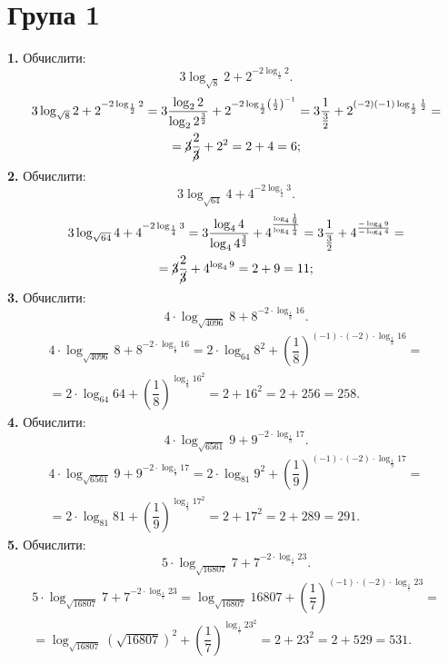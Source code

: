 \section*{Група 1}
\textbf{1.} Обчислити:
$$
3 \log_{\sqrt{8}} 2 + 2^{-2\log_{\frac{1}{2}} 2}.
$$
\begin{multline*}
3 \log_{\sqrt{8}} 2 + 2^{-2\log_{\frac{1}{2}} 2} =
3\frac{\log_2 2}{\log_2 2^\frac{3}{2}} + 2^{-2 \log_{\frac{1}{2}} \left(\frac{1}{2}\right)^{-1}} =
3\frac{1}{\frac{3}{2}} + 2^{(-2)(-1)\log_{\frac{1}{2}} \frac{1}{2}} =\\
= \cancel{3}\frac{2}{\cancel{3}} + 2^2 = 2 + 4 = 6;
\end{multline*}
\textbf{2.} Обчислити:
$$
3\log_{\sqrt{64}} 4 + 4^{-2\log_{\frac{1}{4}} 3}.
$$
\begin{multline*}
3\log_{\sqrt{64}} 4 + 4^{-2\log_{\frac{1}{4}} 3} =
3\frac{\log_4 4}{\log_4 4^{\frac{3}{2}}} + 4^{\frac{\log_4 \frac{1}{9}}{\log_4 \frac{1}{4}}} =
3\frac{1}{\frac{3}{2}} + 4^{\frac{-\log_4 9}{-\log_4 4}} =\\
= \cancel{3}\frac{2}{\cancel{3}} + 4^{\log_4 9} = 2 + 9 = 11;
\end{multline*}
\textbf{3.} Обчислити:
$$
4\cdot\log_{\sqrt{4096}}8+8^{-2\cdot\log_{\frac{1}{8}}16}.
$$
\begin{multline*}
4\cdot\log_{\sqrt{4096}}8+8^{-2\cdot\log_{\frac{1}{8}}16}=
2\cdot\log_{64}8^2+\left(\dfrac{1}{8}\right)^{(-1)\cdot(-2)\cdot\log_{\frac{1}{8}}16}=\\
=2\cdot\log_{64}64+\left(\dfrac{1}{8}\right)^{\log_{\frac{1}{8}}16^2}=
2+16^2=2+256=258.
\end{multline*}
\textbf{4.} Обчислити:
$$
4\cdot\log_{\sqrt{6561}}9+9^{-2\cdot\log_{\frac{1}{9}}17}.
$$
\begin{multline*}
4\cdot\log_{\sqrt{6561}}9+9^{-2\cdot\log_{\frac{1}{9}}17}=
2\cdot\log_{81}9^2+\left(\dfrac{1}{9}\right)^{(-1)\cdot(-2)\cdot\log_{\frac{1}{9}}17}=\\
=2\cdot\log_{81}81+\left(\dfrac{1}{9}\right)^{\log_{\frac{1}{9}}17^2}=
2+17^2=2+289=291.
\end{multline*}
\textbf{5.} Обчислити:
$$
5\cdot\log_{\sqrt{16807}}7+7^{-2\cdot\log_{\frac{1}{7}}23}.
$$
\begin{multline*}
5\cdot\log_{\sqrt{16807}}7+7^{-2\cdot\log_{\frac{1}{7}}23}=
\log_{\sqrt{16807}}16807+\left(\dfrac{1}{7}\right)^{(-1)\cdot(-2)\cdot\log_{\frac{1}{7}}23}=\\
=\log_{\sqrt{16807}}\left(\sqrt{16807}\right)^2+\left(\dfrac{1}{7}\right)^{\log_{\frac{1}{7}}23^2}=
2+23^2=2+529=531.
\end{multline*}
